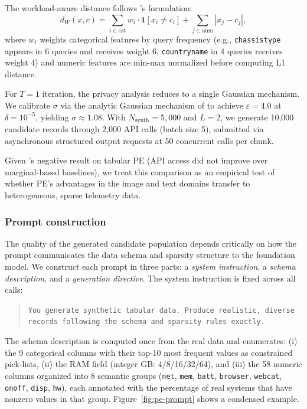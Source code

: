 \documentclass[12pt,letterpaper]{article}
\renewcommand{\_}{\textunderscore\allowbreak}
\begin{document}
The workload-aware distance follows \citeauthor{swanberg2025apiaccessllmsuseful}'s formulation:
\begin{equation}
    d_W(x, c) = \sum_{i \in \text{cat}} w_i \cdot \mathbf{1}[x_i \neq c_i] + \sum_{j \in \text{num}} |x_j - c_j|,
\end{equation}
where $w_i$ weights categorical features by query frequency (e.g., \texttt{chassistype} appears in 6 queries and receives weight 6, \texttt{countryname} in 4 queries receives weight 4) and numeric features are min-max normalized before computing L1 distance.

For $T = 1$ iteration, the privacy analysis reduces to a single Gaussian mechanism. We calibrate $\sigma$ via the analytic Gaussian mechanism of \citet{balle2018improving} to achieve $\varepsilon = 4.0$ at $\delta = 10^{-5}$, yielding $\sigma \approx 1.08$. With $N_{\text{synth}} = 5{,}000$ and $L = 2$, we generate 10{,}000 candidate records through 2{,}000 API calls (batch size 5), submitted via asynchronous structured output requests at 50 concurrent calls per chunk.

Given \citeauthor{swanberg2025apiaccessllmsuseful}'s negative result on tabular PE (API access did not improve over marginal-based baselines), we treat this comparison as an empirical test of whether PE's advantages in the image and text domains transfer to heterogeneous, sparse telemetry data.

\subsubsection{Prompt construction}

The quality of the generated candidate population depends critically on how the prompt communicates the data schema and sparsity structure to the foundation model. We construct each prompt in three parts: a \textit{system instruction}, a \textit{schema description}, and a \textit{generation directive}. The system instruction is fixed across all calls:

\begin{quote}
\small\texttt{You generate synthetic tabular data. Produce realistic, diverse records following the schema and sparsity rules exactly.}
\end{quote}

The schema description is computed once from the real data and enumerates: (i) the 9 categorical columns with their top-10 most frequent values as constrained pick-lists, (ii) the RAM field (integer GB: 4/8/16/32/64), and (iii) the 58 numeric columns organized into 8 semantic groups (\texttt{net}, \texttt{mem}, \texttt{batt}, \texttt{browser}, \texttt{webcat}, \texttt{onoff}, \texttt{disp}, \texttt{hw}), each annotated with the percentage of real systems that have nonzero values in that group. Figure~\ref{fig:pe-prompt} shows a condensed example.
\end{document}
